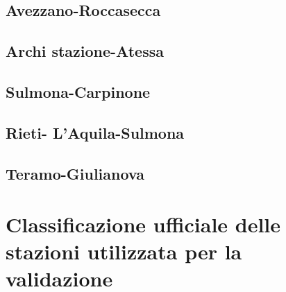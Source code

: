 \newpage
\subsection{Avezzano-Roccasecca}

\subsection{Archi stazione-Atessa}

\subsection{Sulmona-Carpinone}

\subsection{Rieti- L'Aquila-Sulmona}

\subsection{Teramo-Giulianova}


\section{Classificazione ufficiale delle stazioni utilizzata per la validazione }
\label{risultatiUfficiali}

